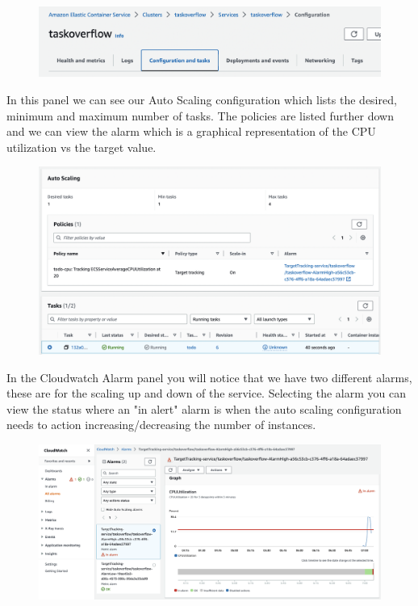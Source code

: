 \documentclass{csse4400}
\begin{document}
\begin{figure}[H]
  \begin{center}
    \includegraphics[width=\textwidth]{images/ecs1}
  \end{center}
\end{figure}

In this panel we can see our Auto Scaling configuration which lists the desired, minimum and maximum number of tasks. The policies are listed further down and we can view the alarm which is a graphical representation of the CPU utilization vs the target value.

\begin{figure}[H]
  \begin{center}
    \includegraphics[width=\textwidth]{images/ecs2}
  \end{center}
\end{figure}

In the Cloudwatch Alarm panel you will notice that we have two different alarms,
these are for the scaling up and down of the service.
Selecting the alarm you can view the status where an "in alert" alarm is when the auto scaling configuration needs to action increasing/decreasing the number of instances.

\begin{figure}[H]
  \begin{center}
    \includegraphics[width=\textwidth]{images/ecs3}
  \end{center}
\end{figure}

%
%
\end{document}
